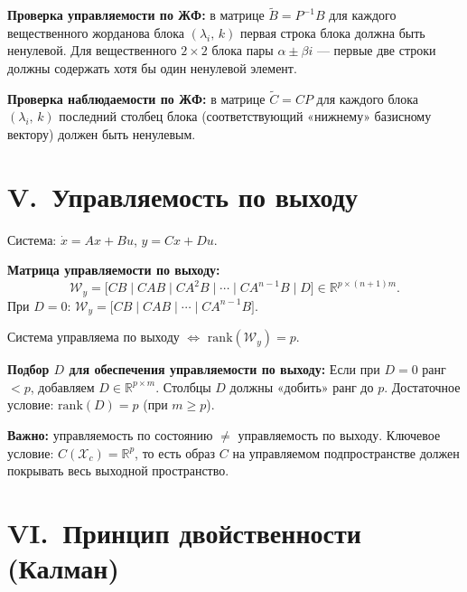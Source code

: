\documentclass[12pt,a4paper]{article}
\begin{document}
	\begin{warnbox}
		\textbf{Проверка управляемости по ЖФ:} в матрице $\tilde{B} = P^{-1}B$ для каждого
		вещественного жорданова блока $(\lambda_i,\, k)$ первая строка блока должна быть ненулевой.
		Для вещественного $2\times2$ блока пары $\alpha\pm\beta i$ --- первые две строки должны
		содержать хотя бы один ненулевой элемент.
	\end{warnbox}
	
	\begin{okbox}
		\textbf{Проверка наблюдаемости по ЖФ:} в матрице $\tilde{C} = CP$ для каждого блока
		$(\lambda_i,\, k)$ последний столбец блока (соответствующий «нижнему» базисному вектору)
		должен быть ненулевым.
	\end{okbox}
	
	\section{V.~Управляемость по выходу}
	
	Система: $\dot{x}=Ax+Bu$, $y=Cx+Du$.
	
	\begin{formulabox}
		\textbf{Матрица управляемости по выходу:}
		\[
		\mathcal{W}_y = \bigl[CB \mid CAB \mid CA^2B \mid \cdots \mid CA^{n-1}B \mid D\bigr]
		\in \mathbb{R}^{p \times (n+1)m}.
		\]
		При $D=0$:\; $\mathcal{W}_y = \bigl[CB \mid CAB \mid \cdots \mid CA^{n-1}B\bigr]$.
	\end{formulabox}
	
	Система управляема по выходу $\Leftrightarrow$ $\mathrm{rank}(\mathcal{W}_y) = p$.
	
	\medskip
	\textbf{Подбор $D$ для обеспечения управляемости по выходу:}
	Если при $D=0$ ранг $< p$, добавляем $D \in \mathbb{R}^{p \times m}$.
	Столбцы $D$ должны «добить» ранг до $p$.
	Достаточное условие: $\mathrm{rank}(D) = p$ (при $m \geq p$).
	
	\begin{dangerbox}
		\textbf{Важно:} управляемость по состоянию $\neq$ управляемость по выходу.
		Ключевое условие: $C(\mathcal{X}_c) = \mathbb{R}^p$, то есть образ $C$ на
		управляемом подпространстве должен покрывать весь выходной пространство.
	\end{dangerbox}
	
	\section{VI.~Принцип двойственности (Калман)}
	
\end{document}
